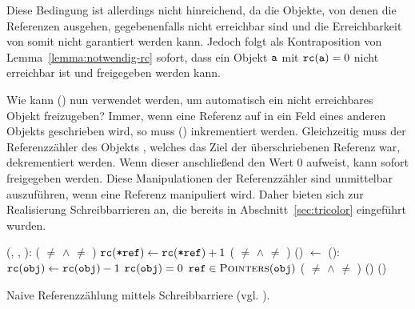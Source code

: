 Diese Bedingung ist allerdings nicht hinreichend, da die Objekte, von denen die Referenzen ausgehen, gegebenenfalls nicht erreichbar sind und die Erreichbarkeit von  somit nicht garantiert werden kann.
Jedoch folgt als Kontraposition von Lemma~\ref{lemma:notwendig-rc} sofort, dass ein Objekt $\texttt{a}$ mit $\texttt{rc}(\texttt{a}) = 0$ nicht erreichbar ist und freigegeben werden kann.

Wie kann () nun verwendet werden, um automatisch ein nicht erreichbares Objekt freizugeben?
Immer, wenn eine Referenz auf  in ein Feld eines anderen Objekts geschrieben wird, so muss () inkrementiert werden.
Gleichzeitig muss der Referenzzähler des Objekts , welches das Ziel der überschriebenen Referenz war, dekrementiert werden.
Wenn dieser anschließend den Wert $0$ aufweist, kann  sofort freigegeben werden.
Diese Manipulationen der Referenzzähler sind unmittelbar auszuführen, wenn eine Referenz manipuliert wird.
Daher bieten sich zur Realisierung Schreibbarrieren an, die bereits in Abschnitt~\ref{sec:tricolor} eingeführt wurden.

\begin{algorithm}[h]
\begin{algorithmic}[1]
	\State \Atomic {}(, , ):
	\State \quad \IF ( $\neq$ \Null $\wedge$  $\neq$ )	
	\State \quad \quad $\texttt{rc}(\texttt{*ref}) \gets \texttt{rc}(\texttt{*ref}) + 1$ 
	\State \quad \IF ( $\neq$ \Null $\wedge$  $\neq$ )	
	\State \quad \quad {}()	
	\State \quad {} $\gets$ 
	\Statex
	\State {}():
	\State \quad $\texttt{rc}(\texttt{obj}) \gets \texttt{rc}(\texttt{obj}) - 1$
	\State \quad \IF $\texttt{rc}(\texttt{obj}) = 0$
	\State \quad \quad \FOREACH $\texttt{ref} \in \textsc{Pointers}(\texttt{obj})$
	\State \quad \quad \quad \IF ( $\neq$ \Null $\wedge$  $\neq$ ) 
	\State \quad \quad \quad \quad {}() 
	\State \quad \quad {}()
\end{algorithmic}
\caption[Naive Referenzzählung]{Naive Referenzzählung mittels Schreibbarriere (vgl. \cite[S. 58]{handbook}).}
\label{algo:naive-rc}
\end{algorithm}

